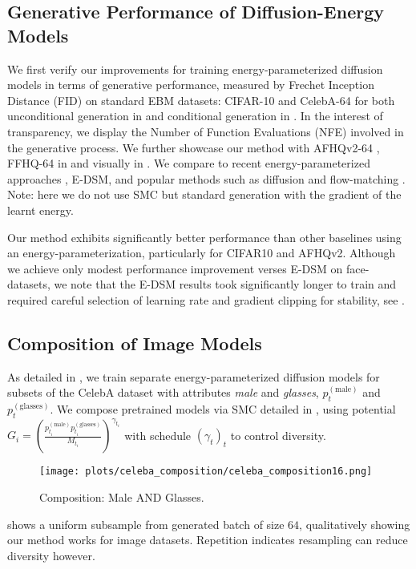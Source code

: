 \subsection{Generative Performance of Diffusion-Energy Models}
We first verify our improvements for training energy-parameterized diffusion models in terms of generative performance, measured by Frechet Inception Distance (FID) \citep{heusel2017gans} on standard EBM datasets: CIFAR-10 \citep{cifar} and CelebA-64 \citep{celeba} for both unconditional generation in  and conditional generation in . In the interest of transparency, we display the Number of Function Evaluations (NFE) involved in the generative process. We further showcase our method with AFHQv2-64 \citep{afhq}, FFHQ-64 \citep{ffhq} in  and visually in . We compare to recent energy-parameterized approaches \citep{gao2020learning, zhu2023learning, hill2023tackling, schroder2024energy}, E-DSM, and popular methods such as diffusion \citep{karras2022elucidating} and flow-matching \citep{lipman2022flow, liu2022rectified}. Note: here we do not use SMC but standard generation with the gradient of the learnt energy.

Our method exhibits significantly better performance than other baselines using an energy-parameterization, particularly for CIFAR10 and AFHQv2. Although we achieve only modest performance improvement verses E-DSM on face-datasets, we note that the E-DSM results took significantly longer to train and required careful selection of learning rate and gradient clipping for stability, see .

\vspace{-0.5cm}
\subsection{Composition of Image Models} \label{exp:img_comp}
As detailed in , we train separate energy-parameterized diffusion models for subsets of the CelebA dataset with attributes \textit{male} and \textit{glasses}, $p^{(\text{male})}_{t}$ and $p^{(\text{glasses})}_{t}$. We compose pretrained models via SMC detailed in , using potential 
$G_i = \left(\tfrac{p^{(\text{male})}_{t_i}p^{(\text{glasses})}_{t_i}}{M_{t_i}}\right)^{\gamma_{t_i}}$ with schedule $(\gamma_t)_t$ to control diversity.
\begin{figure}[hb]
    \centering
        \texttt{[image: plots/celeba\_composition/celeba\_composition16.png]}
    \caption{Composition: Male \textsc{AND} Glasses.} 
    \label{fig:celeba_composition}
\end{figure}
 shows a uniform subsample from generated batch of size $64$, qualitatively showing our method works for image datasets. Repetition indicates resampling can reduce diversity however.

